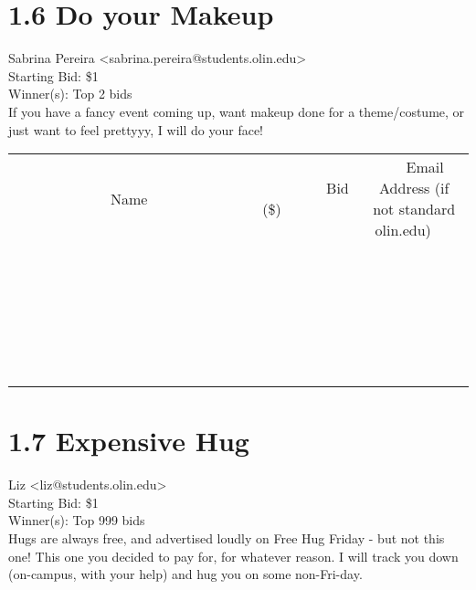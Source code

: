 \documentclass[11pt]{article}
\begin{document}
					\section*{1.6 Do your Makeup}
					Sabrina Pereira <sabrina.pereira@students.olin.edu> \\
					Starting Bid: \$1 \\
					Winner(s): Top 2 bids \\
					If you have a fancy event coming up, want makeup done for a theme/costume, or just want to feel prettyyy, I will do your face! \\
					[6ex]
					\begin{tabular}{c c c}
						~~~~~~~~~~~~~Name~~~~~~~~~~~~~ & ~~~~~~~~~Bid (\$)~~~~~~~~~ & ~~~Email Address (if not standard olin.edu)~~~ \\
				
 & & \\
\hline
 & & \\
\hline
 & & \\
\hline
 & & \\
\hline
 & & \\
\hline
 & & \\
\hline
 & & \\
\hline
 & & \\
\hline
 & & \\
\hline
 & & \\
\hline
 & & \\
\hline
 & & \\
\hline
 & & \\
\hline
 & & \\
\hline
 & & \\
\hline
 & & \\
\hline
 & & \\
\hline
 & & \\
\hline
 & & \\
\hline
 & & \\
\hline
 & & \\
\hline
 & & \\
\hline
 & & \\
\hline
 & & \\
\hline
 & & \\
\hline
 & & \\
\hline
					\end{tabular}
					\clearpage
				
					\section*{1.7 Expensive Hug}
					Liz <liz@students.olin.edu> \\
					Starting Bid: \$1 \\
					Winner(s): Top 999 bids \\
					Hugs are always free, and advertised loudly on Free Hug Friday - but not this one! This one you decided to pay for, for whatever reason. I will track you down (on-campus, with your help) and hug you on some non-Fri-day.
\end{document}
